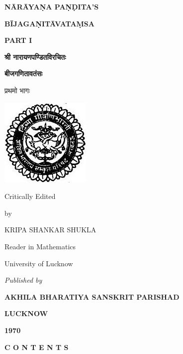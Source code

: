\documentclass[11pt, openany]{book}
\begin{document}
\thispagestyle{empty}
\begin{center}
{\large \textbf{NĀRĀYAṆA PAṆḌITA'S}}
\vspace{2mm}

{\Huge\textbf{BĪJAGAṆITĀVATAṂSA}}
\vspace{2mm}

{\Large\textbf{ PART I}}
\vspace{2mm}

{\large \textbf{श्री नारायणपण्डितविरचितः}}
\vspace{2mm}

{\Large \textbf{बीजगणितावतंसः}}
\vspace{2mm}

प्रथमो भागः
\vspace{10mm}

\includegraphics[scale=0.5]{fig1.jpeg}

\vspace{10mm}

{\small Critically Edited}
\vspace{2mm}

{\small by}
\vspace{2mm}

KRIPA SHANKAR SHUKLA

{\small Reader in Mathematics}

{\small University of Lucknow}
\vspace{40mm}

{\small \textit{Published by}}

\textbf{AKHILA BHARATIYA SANSKRIT PARISHAD}

{\small \textbf{LUCKNOW}}

{\small \textbf{1970}}
\end{center}

\newpage
\thispagestyle{empty}

\begin{center}
\textbf{C O N T E N T S}
\end{center}
\end{document}
